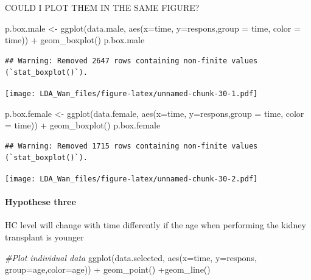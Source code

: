 \documentclass[
]{article}
\newenvironment{Shaded}{\begin{snugshade}}{\end{snugshade}}
\newcommand{\AttributeTok}[1]{\textcolor[rgb]{0.77,0.63,0.00}{#1}}
\newcommand{\CommentTok}[1]{\textcolor[rgb]{0.56,0.35,0.01}{\textit{#1}}}
\newcommand{\FunctionTok}[1]{\textcolor[rgb]{0.00,0.00,0.00}{#1}}
\newcommand{\NormalTok}[1]{#1}
\newcommand{\OtherTok}[1]{\textcolor[rgb]{0.56,0.35,0.01}{#1}}
\newcommand{\SpecialCharTok}[1]{\textcolor[rgb]{0.00,0.00,0.00}{#1}}
\begin{document}
COULD I PLOT THEM IN THE SAME FIGURE?

\begin{Shaded}
\begin{Highlighting}[]
\NormalTok{p.box.male }\OtherTok{\textless{}{-}} \FunctionTok{ggplot}\NormalTok{(data.male, }\FunctionTok{aes}\NormalTok{(}\AttributeTok{x=}\NormalTok{time, }\AttributeTok{y=}\NormalTok{respons,}\AttributeTok{group =}\NormalTok{ time, }\AttributeTok{color =}\NormalTok{ time)) }\SpecialCharTok{+}  
  \FunctionTok{geom\_boxplot}\NormalTok{()}
\NormalTok{p.box.male}
\end{Highlighting}
\end{Shaded}

\begin{verbatim}
## Warning: Removed 2647 rows containing non-finite values (`stat_boxplot()`).
\end{verbatim}

\texttt{[image: LDA\_Wan\_files/figure-latex/unnamed-chunk-30-1.pdf]}

\begin{Shaded}
\begin{Highlighting}[]
\NormalTok{p.box.female }\OtherTok{\textless{}{-}} \FunctionTok{ggplot}\NormalTok{(data.female, }\FunctionTok{aes}\NormalTok{(}\AttributeTok{x=}\NormalTok{time, }\AttributeTok{y=}\NormalTok{respons,}\AttributeTok{group =}\NormalTok{ time, }\AttributeTok{color =}\NormalTok{ time)) }\SpecialCharTok{+}  
  \FunctionTok{geom\_boxplot}\NormalTok{()}
\NormalTok{p.box.female}
\end{Highlighting}
\end{Shaded}

\begin{verbatim}
## Warning: Removed 1715 rows containing non-finite values (`stat_boxplot()`).
\end{verbatim}

\texttt{[image: LDA\_Wan\_files/figure-latex/unnamed-chunk-30-2.pdf]}

\hypertarget{hypothese-three}{%
\paragraph{Hypothese three}\label{hypothese-three}}

HC level will change with time differently if the age when performing
the kidney transplant is younger

\begin{Shaded}
\begin{Highlighting}[]
\CommentTok{\#Plot individual data}
\FunctionTok{ggplot}\NormalTok{(data.selected, }\FunctionTok{aes}\NormalTok{(}\AttributeTok{x=}\NormalTok{time, }\AttributeTok{y=}\NormalTok{respons, }\AttributeTok{group=}\NormalTok{age,}\AttributeTok{color=}\NormalTok{age)) }\SpecialCharTok{+} \FunctionTok{geom\_point}\NormalTok{() }\SpecialCharTok{+}\FunctionTok{geom\_line}\NormalTok{()}
\end{Highlighting}
\end{Shaded}
\end{document}
